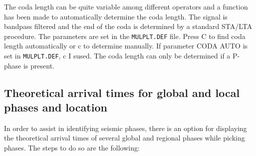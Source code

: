 The coda length can be quite variable among different operators and a function has been made to automatically determine the coda length. The signal is bandpass filtered and the end of the coda is determined by a standard STA/LTA procedure. The parameters are set in the \texttt{MULPLT.DEF} file. Press C to find coda length automatically or c to determine manually. If parameter CODA AUTO is set in \texttt{MULPLT.DEF}, c I sused. The coda length can only be determined if a P-phase is present. 

\subsection{Theoretical arrival times for global and local phases and location}

In order to assist in identifying seismic phases, there is an option for displaying the theoretical arrival times of several global and regional phases while picking phases. The steps to do so are the following: 


